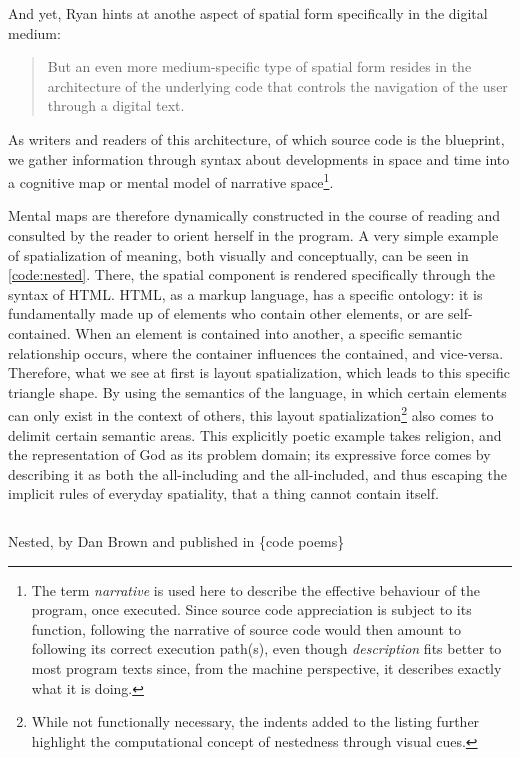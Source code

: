 And yet, Ryan hints at anothe aspect of spatial form specifically in the digital medium:

\begin{quote}
    But an even more medium-specific type of spatial form resides in the architecture of the underlying code that controls the navigation of the user through a digital text. \citep{ryan_four_2021}
\end{quote}

As writers and readers of this architecture, of which source code is the blueprint, we gather information through syntax about developments in space and time into a cognitive map or mental model of narrative space\footnote{The term \emph{narrative} is used here to describe the effective behaviour of the program, once executed. Since source code appreciation is subject to its function, following the narrative of source code would then amount to following its correct execution path(s), even though \emph{description} fits better to most program texts since, from the machine perspective, it describes exactly what it is doing.}.

Mental maps are therefore dynamically constructed in the course of reading and consulted by the reader to orient herself in the program. A very simple example of spatialization of meaning, both visually and conceptually, can be seen in \ref{code:nested}. There, the spatial component is rendered specifically through the syntax of HTML. HTML, as a markup language, has a specific ontology: it is fundamentally made up of elements who contain other elements, or are self-contained. When an element is contained into another, a specific semantic relationship occurs, where the container influences the contained, and vice-versa. Therefore, what we see at first is layout spatialization, which leads to this specific triangle shape. By using the semantics of the language, in which certain elements can only exist in the context of others, this layout spatialization\footnote{While not functionally necessary, the indents added to the listing further highlight the computational concept of nestedness through visual cues.} also comes to delimit certain semantic areas. This explicitly poetic example takes religion, and the representation of God as its problem domain; its expressive force comes by describing it as both the all-including and the all-included, and thus escaping the implicit rules of everyday spatiality, that a thing cannot contain itself.

\begin{listing}
    \inputminted{html}{./corpus/nested.html}
    \caption{Nested, by Dan Brown and published in \{code poems\} \citep{bertram_code_2012}}
    \label{code:nested}
\end{listing}

